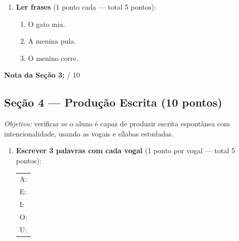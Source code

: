 \begin{avaliacao}
\begin{enumerate}[resume]
  \begin{center}
  $\rightarrow$ mesa \quad casa \quad sapo \quad luto \quad resto
  \end{center}

  \item \textbf{Ler frases} (1 ponto cada — total 5 pontos):

  \begin{enumerate}[label=\arabic*., leftmargin=1.5cm]
    \item O gato mia.
    \item A menina pula.
    \item O menino corre.
  \end{enumerate}
\end{enumerate}

\medskip
\noindent\textbf{Nota da Seção 3:} \underline{\hspace{1cm}} / 10

\subsection*{Seção 4 — Produção Escrita (10 pontos)}

\textit{Objetivo:} verificar se o aluno é capaz de produzir escrita
espontânea com intencionalidade, usando as vogais e sílabas estudadas.

\begin{enumerate}[resume]
  \item \textbf{Escrever 3 palavras com cada vogal} (1 ponto por vogal — total 5 pontos):

  \begin{center}
  \begin{tabular}{l}
    A: \underline{\hspace{2.5cm}} \quad \underline{\hspace{2.5cm}} \quad \underline{\hspace{2.5cm}} \\[0.5em]
    E: \underline{\hspace{2.5cm}} \quad \underline{\hspace{2.5cm}} \quad \underline{\hspace{2.5cm}} \\[0.5em]
    I: \underline{\hspace{2.5cm}} \quad \underline{\hspace{2.5cm}} \quad \underline{\hspace{2.5cm}} \\[0.5em]
    O: \underline{\hspace{2.5cm}} \quad \underline{\hspace{2.5cm}} \quad \underline{\hspace{2.5cm}} \\[0.5em]
    U: \underline{\hspace{2.5cm}} \quad \underline{\hspace{2.5cm}} \quad \underline{\hspace{2.5cm}} \\
  \end{tabular}
  \end{center}


\end{enumerate}
\end{avaliacao}
